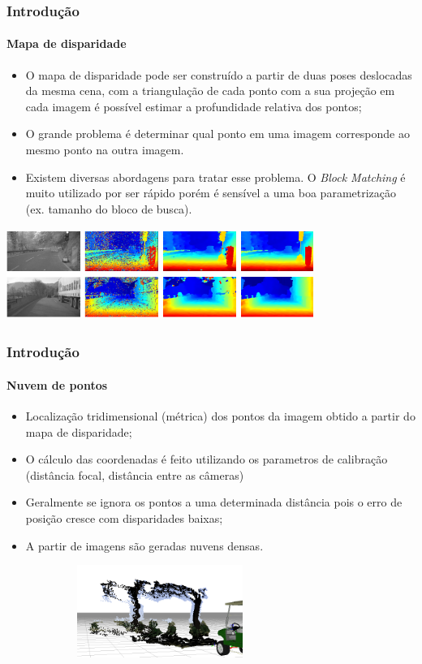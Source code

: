 \documentclass[brazil]{beamer}
\begin{document}
\begin{frame}
\frametitle{Introdução}
\framesubtitle{Mapa de disparidade}

\begin{itemize}
  \item O mapa de disparidade pode ser construído a partir de duas poses
  deslocadas da mesma cena, com a triangulação de cada ponto com a sua projeção em cada imagem é possível
  estimar a profundidade relativa dos pontos;
  \item O grande problema é determinar qual ponto em uma imagem corresponde ao
  mesmo ponto na outra imagem.
  \item Existem diversas abordagens para tratar esse problema. O \textit{Block
  Matching} é muito utilizado por ser rápido porém é sensível a uma boa
  parametrização (ex. tamanho do bloco de busca).
\end{itemize}

\includegraphics[width=10cm,height=3cm,]{../img/disp_map.png}


\end{frame}


\begin{frame}
\frametitle{Introdução}
\framesubtitle{Nuvem de pontos}

\begin{itemize}
  \item Localização tridimensional (métrica) dos pontos da imagem obtido a
  partir do mapa de disparidade;
  \item O cálculo das coordenadas é feito utilizando os parametros de calibração
  (distância focal, distância entre as câmeras)
  \item Geralmente se ignora os pontos a uma determinada distância pois o erro
  de posição cresce com disparidades baixas;
  \item A partir de imagens são geradas nuvens densas.
\end{itemize}
\includegraphics[width=10cm,height=3cm,]{../img/point_cloud_3b.png}

\end{frame}
\end{document}
